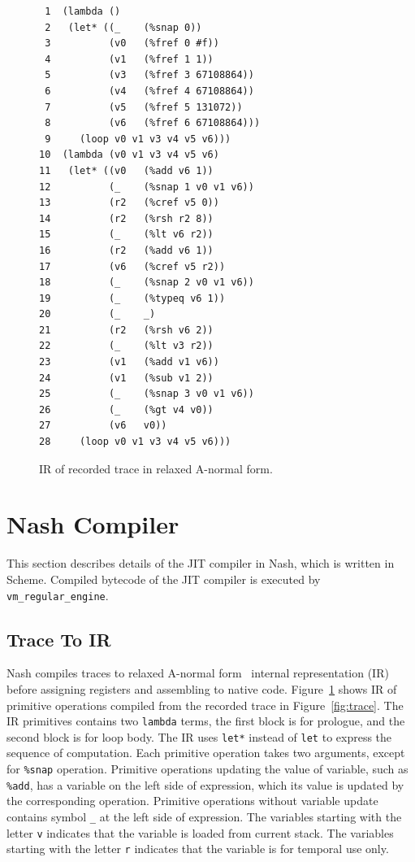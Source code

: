 \documentclass[preprint, 10pt]{sigplanconf}
\begin{document}
\begin{figure}
  \centering
  \small
\begin{verbatim}
 1  (lambda ()
 2   (let* ((_    (%snap 0))
 3          (v0   (%fref 0 #f))
 4          (v1   (%fref 1 1))
 5          (v3   (%fref 3 67108864))
 6          (v4   (%fref 4 67108864))
 7          (v5   (%fref 5 131072))
 8          (v6   (%fref 6 67108864)))
 9     (loop v0 v1 v3 v4 v5 v6)))
10  (lambda (v0 v1 v3 v4 v5 v6)
11   (let* ((v0   (%add v6 1))
12          (_    (%snap 1 v0 v1 v6))
13          (r2   (%cref v5 0))
14          (r2   (%rsh r2 8))
15          (_    (%lt v6 r2))
16          (r2   (%add v6 1))
17          (v6   (%cref v5 r2))
18          (_    (%snap 2 v0 v1 v6))
19          (_    (%typeq v6 1))
20          (_    _)
21          (r2   (%rsh v6 2))
22          (_    (%lt v3 r2))
23          (v1   (%add v1 v6))
24          (v1   (%sub v1 2))
25          (_    (%snap 3 v0 v1 v6))
26          (_    (%gt v4 v0))
27          (v6   v0))
28     (loop v0 v1 v3 v4 v5 v6)))
\end{verbatim}
\caption{IR of recorded trace in relaxed A-normal form.}
\label{fig:anf}
\end{figure}

\section{Nash Compiler}
\label{sec:compiler}

This section describes details of the JIT compiler in Nash, which is written in
Scheme. Compiled bytecode of the JIT compiler is executed by
\texttt{vm\_regular\_engine}.

\subsection{Trace To IR}
Nash compiles traces to relaxed A-normal form~\cite{flanagan1993essence}
internal representation (IR) before assigning registers and assembling to native
code. Figure~\hyperref[fig:anf]{\ref{fig:anf}} shows IR of primitive operations
compiled from the recorded trace in
Figure~\hyperref[fig:trace]{\ref{fig:trace}}. The IR primitives contains two
\texttt{lambda} terms, the first block is for prologue, and the second block is
for loop body. The IR uses \texttt{let*} instead of \texttt{let} to express the
sequence of computation. Each primitive operation takes two arguments, except
for \texttt{\%snap} operation. Primitive operations updating the value of
variable, such as \texttt{\%add}, has a variable on the left side of expression,
which its value is updated by the corresponding operation. Primitive operations
without variable update contains symbol \texttt{\_} at the left side of
expression. The variables starting with the letter \texttt{v} indicates that the
variable is loaded from current stack. The variables starting with the letter
\texttt{r} indicates that the variable is for temporal use only.
\end{document}
